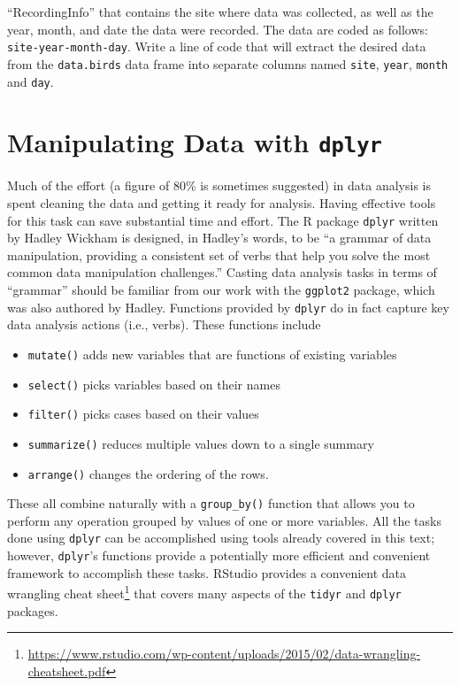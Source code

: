 \documentclass[
]{krantz}
\providecommand{\tightlist}{%
  \setlength{\itemsep}{0pt}\setlength{\parskip}{0pt}}
\renewcommand{\href}[2]{#2\footnote{\url{#1}}}
\begin{document}
``RecordingInfo'' that contains the site where data was collected, as well as the year, month, and date the data were recorded. The data are coded as follows: \texttt{site-year-month-day}. Write a line of code that will extract the desired data from the \texttt{data.birds} data frame into separate columns named \texttt{site}, \texttt{year}, \texttt{month} and \texttt{day}.

\hypertarget{dplyr}{%
\section{\texorpdfstring{Manipulating Data with \texttt{dplyr}}{Manipulating Data with dplyr}}\label{dplyr}}

Much of the effort (a figure of 80\% is sometimes suggested) in data analysis is spent cleaning the data and getting it ready for analysis. Having effective tools for this task can save substantial time and effort. The R package \texttt{dplyr} written by Hadley Wickham is designed, in Hadley's words, to be ``a grammar of data manipulation, providing a consistent set of verbs that help you solve the most common data manipulation challenges.'' Casting data analysis tasks in terms of ``grammar'' should be familiar from our work with the \texttt{ggplot2} package, which was also authored by Hadley. Functions provided by \texttt{dplyr} do in fact capture key data analysis actions (i.e., verbs). These functions include

\begin{itemize}
\tightlist
\item
  \texttt{mutate()} adds new variables that are functions of existing variables
\item
  \texttt{select()} picks variables based on their names
\item
  \texttt{filter()} picks cases based on their values
\item
  \texttt{summarize()} reduces multiple values down to a single summary
\item
  \texttt{arrange()} changes the ordering of the rows.
\end{itemize}

These all combine naturally with a \texttt{group\_by()} function that allows you to perform any operation grouped by values of one or more variables. All the tasks done using \texttt{dplyr} can be accomplished using tools already covered in this text; however, \texttt{dplyr}'s functions provide a potentially more efficient and convenient framework to accomplish these tasks. RStudio provides a convenient \href{https://www.rstudio.com/wp-content/uploads/2015/02/data-wrangling-cheatsheet.pdf}{data wrangling cheat sheet} that covers many aspects of the \texttt{tidyr} and \texttt{dplyr} packages.
\end{document}

